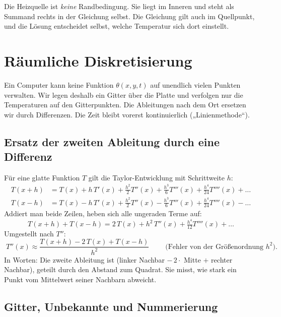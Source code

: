 \documentclass[11pt,a4paper]{article}
\numberwithin{equation}{section}
\begin{document}
Die Heizquelle ist \emph{keine} Randbedingung. Sie liegt im Inneren und steht als Summand rechts in der Gleichung selbst. Die Gleichung gilt auch im Quellpunkt, und die Lösung entscheidet selbst, welche Temperatur sich dort einstellt.

\section{Räumliche Diskretisierung}
\label{sec:ort}

Ein Computer kann keine Funktion $\theta(x,y,t)$ auf unendlich vielen Punkten verwalten. Wir legen deshalb ein Gitter über die Platte und verfolgen nur die Temperaturen auf den Gitterpunkten. Die Ableitungen nach dem Ort ersetzen wir durch Differenzen. Die Zeit bleibt vorerst kontinuierlich („Linienmethode“).

\subsection{Ersatz der zweiten Ableitung durch eine Differenz}

Für eine glatte Funktion $T$ gilt die Taylor-Entwicklung mit Schrittweite $h$:
\begin{align}
 T(x+h)&=T(x)+h\,T'(x)+\tfrac{h^2}{2}T''(x)+\tfrac{h^3}{6}T'''(x)+\tfrac{h^4}{24}T''''(x)+\dots\\
 T(x-h)&=T(x)-h\,T'(x)+\tfrac{h^2}{2}T''(x)-\tfrac{h^3}{6}T'''(x)+\tfrac{h^4}{24}T''''(x)-\dots
\end{align}
Addiert man beide Zeilen, heben sich alle ungeraden Terme auf:
\begin{equation}
 T(x+h)+T(x-h)=2\,T(x)+h^2\,T''(x)+\tfrac{h^4}{12}T''''(x)+\dots
\end{equation}
Umgestellt nach $T''$:
\begin{equation}
 \boxed{\;T''(x)\approx\frac{T(x+h)-2\,T(x)+T(x-h)}{h^2}\;}
 \qquad\text{(Fehler von der Größenordnung } h^2\text{)}.
 \label{eq:zweitediff}
\end{equation}
In Worten: Die zweite Ableitung ist (linker Nachbar $-\,2\cdot$ Mitte $+$ rechter Nachbar), geteilt durch den Abstand zum Quadrat. Sie misst, wie stark ein Punkt vom Mittelwert seiner Nachbarn abweicht.

\subsection{Gitter, Unbekannte und Nummerierung}
\end{document}
